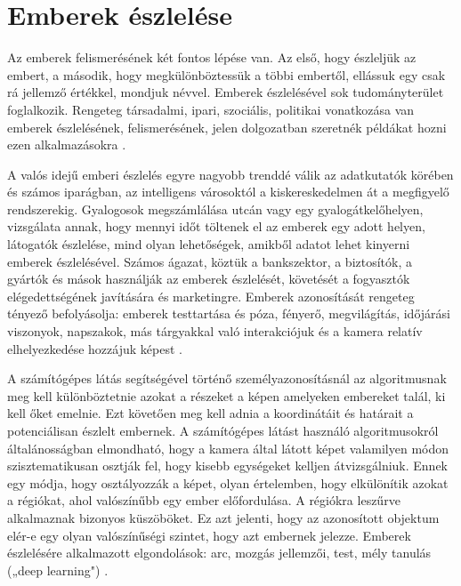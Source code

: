 \section{Emberek észlelése}
Az emberek felismerésének két fontos lépése van. Az első, hogy észleljük az embert, a második, hogy megkülönböztessük a többi embertől, ellássuk egy csak rá jellemző értékkel, mondjuk névvel. Emberek észlelésével sok tudományterület foglalkozik. Rengeteg társadalmi, ipari, szociális, politikai vonatkozása van emberek észlelésének, felismerésének, jelen dolgozatban szeretnék példákat hozni ezen alkalmazásokra \cite{artc05}.

A valós idejű emberi észlelés egyre nagyobb trenddé válik az adatkutatók körében és számos iparágban, az intelligens városoktól a kiskereskedelmen át a megfigyelő rendszerekig. Gyalogosok megszámlálása utcán vagy egy gyalogátkelőhelyen, vizsgálata annak, hogy mennyi időt töltenek el az emberek egy adott helyen, látogatók észlelése, mind olyan lehetőségek, amikből adatot lehet kinyerni emberek észlelésével. Számos ágazat, köztük a bankszektor, a biztosítók, a gyártók és mások használják az emberek észlelését, követését a fogyasztók elégedettségének javítására és marketingre. Emberek azonosítását rengeteg tényező befolyásolja: emberek testtartása és póza, fényerő, megvilágítás, időjárási viszonyok, napszakok, más tárgyakkal való interakciójuk és a kamera relatív elhelyezkedése hozzájuk képest \cite{artc06}.

A számítógépes látás segítségével történő személyazonosításnál az algoritmusnak meg kell különböztetnie azokat a részeket a képen amelyeken embereket talál, ki kell őket emelnie. Ezt követően meg kell adnia a koordinátáit és határait a potenciálisan észlelt embernek. A számítógépes látást használó algoritmusokról általánosságban elmondható, hogy a kamera által látott képet valamilyen módon szisztematikusan osztják fel, hogy kisebb egységeket kelljen átvizsgálniuk. Ennek egy módja, hogy osztályozzák a képet, olyan értelemben, hogy elkülönítik azokat a régiókat, ahol valószínűbb egy ember előfordulása. A régiókra leszűrve alkalmaznak bizonyos küszöböket. Ez azt jelenti, hogy az azonosított objektum elér-e egy olyan valószínűségi szintet, hogy azt embernek jelezze.
Emberek észlelésére alkalmazott elgondolások: arc, mozgás jellemzői, test, mély tanulás („deep learning") \cite{artc06}.

